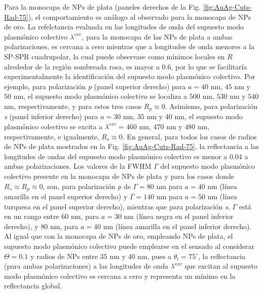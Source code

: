 Para la monocapa de NPs de plata (paneles derechos de la Fig. \ref{fig:AuAg-Cuts-Rad-75}), el comportamiento es análogo al observado para la monocapa de NPs de oro. La refelctancia evaluada en las longitudes de onda del supuesto modo plasmónico colectivo $\lambda^{exc}$, para la monocapa de las NPs de plata a ambas polarizaciones, es cercana a cero mientras que a longitudes de onda menores a la SP-SPR cuadrupolar, la cual puede observase como mínimos locales en $R$ alrededor de la región sombreada rosa, es mayor a $0.6$, por lo que se facilitaría experimentalmente la identificación del supuesto modo plasmónico colectivo. Por ejemplo, para polarización \emph{p} (panel superior derecho) para $a=40$ nm, $45$ nm y $50$ nm, el supuesto modo plasmónico colectivo se localiza a $500$ nm, $530$ nm y $540$ nm, respectivamente, y para estos tres casos $R_p\approx 0$. Asimismo, para polarización \emph{s} (panel inferior derecho) para $a=30$ nm, $35$ nm y $40$ nm, el supuesto modo plasmónico colectivo se excita a $\lambda^{exc}=460$ nm, $470$ nm y $480$ nm, respectivamente, e igualmente, $R_s\approx 0$. En general, para todos los casos de radios de NPs de plata mostrados en la Fig. \ref{fig:AuAg-Cuts-Rad-75}, la reflectancia a las longitudes de ondas del supuesto modo plasmónico colectivo es menor a $0.04$ a ambas polarizaciones. Los valores de la FWHM $\Gamma$ del supuesto modo plasmónico colectivo presente en la monocapa de NPs de plata y para los casos donde $R_s\approx R_p \approx 0$, son, para polarización \emph{p} de $\Gamma=80$ nm para $a=40$ nm (línea amarilla en el panel superior derecho) y $\Gamma=140$ nm para $a=50$ nm (línea turquesa en el panel superior derecho), mientras que para polarización \emph{s}, $\Gamma$ está en un rango entre $60$ nm, para $a=30$ nm (línea negra en el panel inferior derecho), y $80$ nm, para $a=40$ nm (línea amarilla en el panel inferior derecho). Al igual que con la monocapa de NPs de oro, empleando NPs de plata, el supuesto modo plasmónico colectivo puede emplearse en el sensado al considerar $\Theta=0.1$ y radios de NPs entre $35$ nm y $40$ nm, pues a $\theta_i=75^\circ$, la reflectancia (para ambas polarizaciones) a las longitudes de onda  $\lambda^{exc}$ que excitan al supuesto modo plasmónico colectivo es cercana a cero y representa un mínimo en la reflectancia global.

